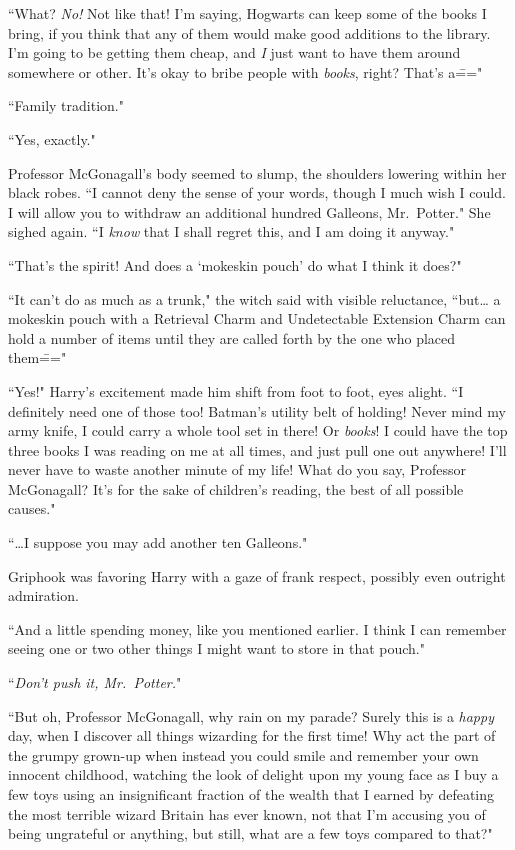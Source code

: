 ``What? \emph{No!} Not like that! I'm saying, Hogwarts can keep some of the books I bring, if you think that any of them would make good additions to the library. I'm going to be getting them cheap, and \emph{I} just want to have them around somewhere or other. It's okay to bribe people with \emph{books}, right? That's a\==="

``Family tradition."

``Yes, exactly."

Professor McGonagall's body seemed to slump, the shoulders lowering within her black robes. ``I cannot deny the sense of your words, though I much wish I could. I will allow you to withdraw an additional hundred Galleons, Mr.~Potter." She sighed again. ``I \emph{know} that I shall regret this, and I am doing it anyway."

``That's the spirit! And does a `mokeskin pouch' do what I think it does?"

``It can't do as much as a trunk," the witch said with visible reluctance, ``but{\ldots} a mokeskin pouch with a Retrieval Charm and Undetectable Extension Charm can hold a number of items until they are called forth by the one who placed them\==="

``Yes!" Harry's excitement made him shift from foot to foot, eyes alight. ``I definitely need one of those too! Batman's utility belt of holding! Never mind my army knife, I could carry a whole tool set in there! Or \emph{books}! I could have the top three books I was reading on me at all times, and just pull one out anywhere! I'll never have to waste another minute of my life! What do you say, Professor McGonagall? It's for the sake of children's reading, the best of all possible causes."

``{\ldots}I suppose you may add another ten Galleons."

Griphook was favoring Harry with a gaze of frank respect, possibly even outright admiration.

``And a little spending money, like you mentioned earlier. I think I can remember seeing one or two other things I might want to store in that pouch."

``\emph{Don't push it, Mr.~Potter.}"

``But oh, Professor McGonagall, why rain on my parade? Surely this is a \emph{happy} day, when I discover all things wizarding for the first time! Why act the part of the grumpy grown-up when instead you could smile and remember your own innocent childhood, watching the look of delight upon my young face as I buy a few toys using an insignificant fraction of the wealth that I earned by defeating the most terrible wizard Britain has ever known, not that I'm accusing you of being ungrateful or anything, but still, what are a few toys compared to that?"

